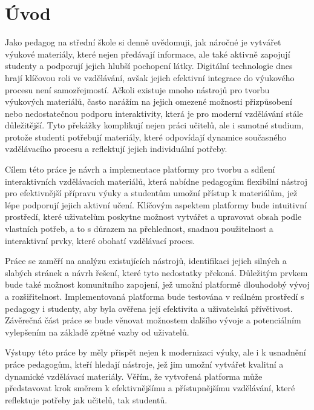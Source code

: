 \chapter*{Úvod}
\setcounter{page}{1}

Jako pedagog na střední škole si denně uvědomuji, jak náročné je vytvářet výukové materiály, které nejen předávají informace, ale také aktivně zapojují studenty a podporují jejich hlubší pochopení látky. 
Digitální technologie dnes hrají klíčovou roli ve vzdělávání, avšak jejich efektivní integrace do výukového procesu není samozřejmostí. 
Ačkoli existuje mnoho nástrojů pro tvorbu výukových materiálů, často narážím na jejich omezené možnosti přizpůsobení nebo nedostatečnou podporu interaktivity, která je pro moderní vzdělávání stále důležitější. 
Tyto překážky komplikují nejen práci učitelů, ale i samotné studium, protože studenti potřebují materiály, které odpovídají dynamice současného vzdělávacího procesu a reflektují jejich individuální potřeby.

Cílem této práce je návrh a implementace platformy pro tvorbu a sdílení interaktivních vzdělávacích materiálů, která nabídne pedagogům flexibilní nástroj pro efektivnější přípravu výuky a studentům umožní přístup k materiálům, jež lépe podporují jejich aktivní učení. 
Klíčovým aspektem platformy bude intuitivní prostředí, které uživatelům poskytne možnost vytvářet a upravovat obsah podle vlastních potřeb, a to s důrazem na přehlednost, snadnou použitelnost a interaktivní prvky, které obohatí vzdělávací proces.

Práce se zaměří na analýzu existujících nástrojů, identifikaci jejich silných a slabých stránek a návrh řešení, které tyto nedostatky překoná. 
Důležitým prvkem bude také možnost komunitního zapojení, jež umožní platformě dlouhodobý vývoj a rozšiřitelnost. 
Implementovaná platforma bude testována v reálném prostředí s pedagogy i studenty, aby byla ověřena její efektivita a uživatelská přívětivost. 
Závěrečná část práce se bude věnovat možnostem dalšího vývoje a potenciálním vylepšením na základě zpětné vazby od uživatelů.

Výstupy této práce by měly přispět nejen k modernizaci výuky, ale i k usnadnění práce pedagogům, kteří hledají nástroje, jež jim umožní vytvářet kvalitní a dynamické vzdělávací materiály. 
Věřím, že vytvořená platforma může představovat krok směrem k efektivnějšímu a přístupnějšímu vzdělávání, které reflektuje potřeby jak učitelů, tak studentů.
